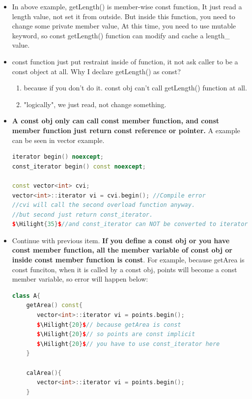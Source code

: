 \documentclass[a4paper,12pt,twoside]{book}
\newcommand{\Hilight}[1]{\makebox[0pt][l]{\color{yellow}\rule[-3pt]{#1em}{11pt}}}
\begin{document}
\begin{itemize}
\item In above example, getLength() is member-wise const function, It just read a length value, not set it from outside. But inside this function, you need to change some private member value, At this time, you need to use mutable keyword, so const getLength() function can modify and cache a length\_ value.

\item const function just put restraint inside of function, it not ask caller to be a const object at all. Why I declare getLength() as const?
\begin{enumerate}
	\item because if you don't do it. const obj can't call getLength() function at all. 
	\item "logically", we just read, not change something.
\end{enumerate}


\item \textbf{A const obj only can call const member function, and const member function just return const reference or pointer.} A example can be seen in vector example.  

\begin{lstlisting}[frame=single, language=c++]
iterator begin() noexcept;
const_iterator begin() const noexcept;

const vector<int> cvi;
vector<int>::iterator vi = cvi.begin(); //Compile error
//cvi will call the second overload function anyway.
//but second just return const_iterator. 
$\Hilight{35}$//and const_iterator can NOT be converted to iterator implicitly.
\end{lstlisting}

\item Continue with previous item.\textbf{ If you define a const obj or you have const member function, all the member variable of const obj or inside const member function is const}. For example, because getArea is const funciton, when it is called by a const obj, points will become a const member variable, so error will happen below: 

\begin{lstlisting}[frame=single, language=c++]
class A{
	getArea() const{
	   vector<int>::iterator vi = points.begin();
	   $\Hilight{20}$// because getArea is const
	   $\Hilight{20}$// so points are const implicit
	   $\Hilight{20}$// you have to use const_iterator here
	}

	calArea(){
	   vector<int>::iterator vi = points.begin();
	}


\end{lstlisting}
\end{itemize}
\end{document}
